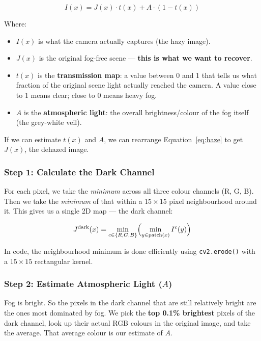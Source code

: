\documentclass[12pt, a4paper]{article}
\begin{document}
\begin{equation}
  I(x) = J(x) \cdot t(x) + A \cdot (1 - t(x))
  \label{eq:haze}
\end{equation}

Where:
\begin{itemize}
  \item $I(x)$ is what the camera actually captures (the hazy image).
  \item $J(x)$ is the original fog-free scene — \textbf{this is what we want to recover}.
  \item $t(x)$ is the \textbf{transmission map}: a value between 0 and 1 that
  tells us what fraction of the original scene light actually reached the camera.
  A value close to 1 means clear; close to 0 means heavy fog.
  \item $A$ is the \textbf{atmospheric light}: the overall brightness/colour of
  the fog itself (the grey-white veil).
\end{itemize}

If we can estimate $t(x)$ and $A$, we can rearrange Equation~\ref{eq:haze} to
get $J(x)$, the dehazed image.

\subsubsection{Step 1: Calculate the Dark Channel}

For each pixel, we take the \textit{minimum} across all three colour channels
(R, G, B). Then we take the \textit{minimum} of that within a $15 \times 15$
pixel neighbourhood around it. This gives us a single 2D map — the dark channel:

\begin{equation}
  J^{\text{dark}}(x) =
  \min_{c \in \{R,G,B\}}
  \Bigl(
    \min_{y \in \text{patch}(x)} I^c(y)
  \Bigr)
  \label{eq:dark_channel}
\end{equation}

In code, the neighbourhood minimum is done efficiently using
\texttt{cv2.erode()} with a $15 \times 15$ rectangular kernel.

\subsubsection{Step 2: Estimate Atmospheric Light ($A$)}

Fog is bright. So the pixels in the dark channel that are still relatively bright
are the ones most dominated by fog. We pick the \textbf{top 0.1\% brightest}
pixels of the dark channel, look up their actual RGB colours in the original
image, and take the average. That average colour is our estimate of $A$.
\end{document}
